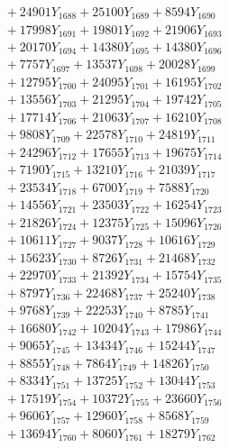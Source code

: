 \documentclass[a4paper,10pt]{article}
\begin{document}
{\begin{align}
&\;  + 24901 Y_{1688} + 25100 Y_{1689} + 8594 Y_{1690} \\[0.3ex]
&\;  + 17998 Y_{1691} + 19801 Y_{1692} + 21906 Y_{1693} \\[0.3ex]
&\;  + 20170 Y_{1694} + 14380 Y_{1695} + 14380 Y_{1696} \\[0.3ex]
&\;  + 7757 Y_{1697} + 13537 Y_{1698} + 20028 Y_{1699} \\[0.3ex]
&\;  + 12795 Y_{1700} + 24095 Y_{1701} + 16195 Y_{1702} \\[0.3ex]
&\;  + 13556 Y_{1703} + 21295 Y_{1704} + 19742 Y_{1705} \\[0.3ex]
&\;  + 17714 Y_{1706} + 21063 Y_{1707} + 16210 Y_{1708} \\[0.5ex]\allowbreak
&\;  + 9808 Y_{1709} + 22578 Y_{1710} + 24819 Y_{1711} \\[0.3ex]
&\;  + 24296 Y_{1712} + 17655 Y_{1713} + 19675 Y_{1714} \\[0.3ex]
&\;  + 7190 Y_{1715} + 13210 Y_{1716} + 21039 Y_{1717} \\[0.3ex]
&\;  + 23534 Y_{1718} + 6700 Y_{1719} + 7588 Y_{1720} \\[0.3ex]
&\;  + 14556 Y_{1721} + 23503 Y_{1722} + 16254 Y_{1723} \\[0.3ex]
&\;  + 21826 Y_{1724} + 12375 Y_{1725} + 15096 Y_{1726} \\[0.3ex]
&\;  + 10611 Y_{1727} + 9037 Y_{1728} + 10616 Y_{1729} \\[0.3ex]
&\;  + 15623 Y_{1730} + 8726 Y_{1731} + 21468 Y_{1732} \\[0.3ex]
&\;  + 22970 Y_{1733} + 21392 Y_{1734} + 15754 Y_{1735} \\[0.3ex]
&\;  + 8797 Y_{1736} + 22468 Y_{1737} + 25240 Y_{1738} \\[0.5ex]\allowbreak
&\;  + 9768 Y_{1739} + 22253 Y_{1740} + 8785 Y_{1741} \\[0.3ex]
&\;  + 16680 Y_{1742} + 10204 Y_{1743} + 17986 Y_{1744} \\[0.3ex]
&\;  + 9065 Y_{1745} + 13434 Y_{1746} + 15244 Y_{1747} \\[0.3ex]
&\;  + 8855 Y_{1748} + 7864 Y_{1749} + 14826 Y_{1750} \\[0.3ex]
&\;  + 8334 Y_{1751} + 13725 Y_{1752} + 13044 Y_{1753} \\[0.3ex]
&\;  + 17519 Y_{1754} + 10372 Y_{1755} + 23660 Y_{1756} \\[0.3ex]
&\;  + 9606 Y_{1757} + 12960 Y_{1758} + 8568 Y_{1759} \\[0.3ex]
&\;  + 13694 Y_{1760} + 8060 Y_{1761} + 18279 Y_{1762} \\[0.3ex]

\end{align}}
\end{document}
